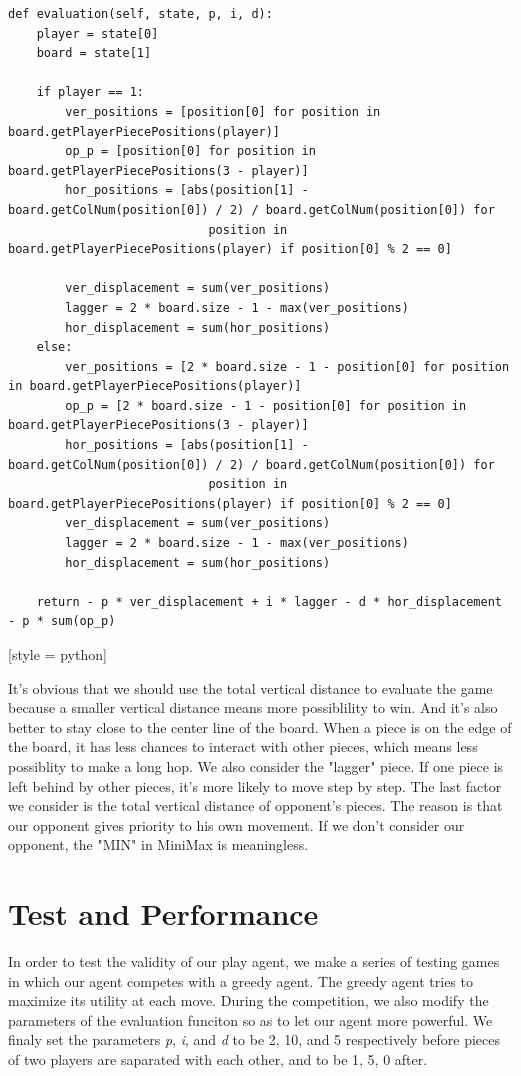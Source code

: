 \documentclass[aps,letterpaper,10pt]{article}
\begin{document}
\begin{lstlisting}[style = python]
def evaluation(self, state, p, i, d):
	player = state[0]
	board = state[1]

	if player == 1:
		ver_positions = [position[0] for position in board.getPlayerPiecePositions(player)]
		op_p = [position[0] for position in board.getPlayerPiecePositions(3 - player)]
		hor_positions = [abs(position[1] - board.getColNum(position[0]) / 2) / board.getColNum(position[0]) for
							position in board.getPlayerPiecePositions(player) if position[0] % 2 == 0]

		ver_displacement = sum(ver_positions)
		lagger = 2 * board.size - 1 - max(ver_positions)
		hor_displacement = sum(hor_positions)
	else:
		ver_positions = [2 * board.size - 1 - position[0] for position in board.getPlayerPiecePositions(player)]
		op_p = [2 * board.size - 1 - position[0] for position in board.getPlayerPiecePositions(3 - player)]
		hor_positions = [abs(position[1] - board.getColNum(position[0]) / 2) / board.getColNum(position[0]) for
							position in board.getPlayerPiecePositions(player) if position[0] % 2 == 0]
		ver_displacement = sum(ver_positions)
		lagger = 2 * board.size - 1 - max(ver_positions)
		hor_displacement = sum(hor_positions)

	return - p * ver_displacement + i * lagger - d * hor_displacement - p * sum(op_p)
\end{lstlisting}[style = python]

It's obvious that we should use the total vertical distance to evaluate the game because a smaller vertical distance means more possiblility to win.
And it's also better to stay close to the center line of the board. 
When a piece is on the edge of the board, it has less chances to interact with other pieces,
which means less possiblity to make a long hop.
We also consider the "lagger" piece. If one piece is left behind by other pieces, it's more likely to move step by step.
The last factor we consider is the total vertical distance of opponent's pieces. 
The reason is that our opponent gives priority to his own movement. 
If we don't consider our opponent, the "MIN" in MiniMax is meaningless.

\section{Test and Performance}
In order to test the validity of our play agent, we make a series of testing games in which our agent competes with a greedy agent. The greedy agent tries to maximize its utility at each move. During the competition, we also modify the parameters of the evaluation funciton so as to let our agent more powerful. We finaly set the parameters {\itshape p}, {\itshape i}, and {\itshape d} to be 2, 10, and 5 respectively before pieces of two players are saparated with each other, and to be 1, 5, 0 after. 
\end{document}
